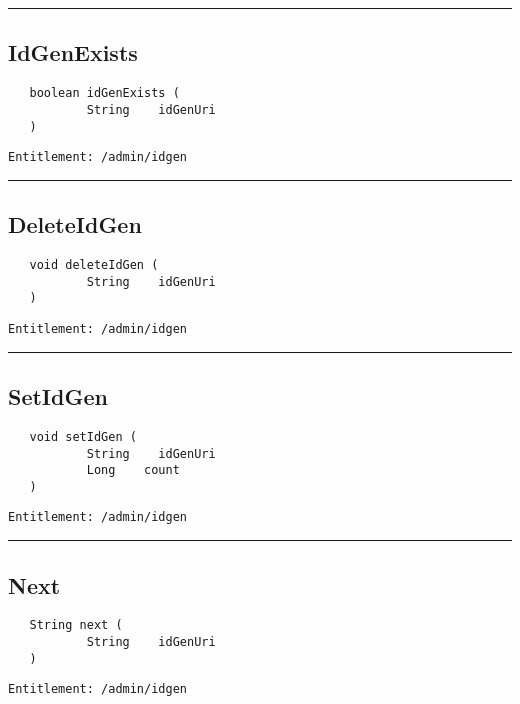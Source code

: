 \rule{12cm}{2pt}
\subsection{IdGenExists}
\label{Api:IdGenExists}
\begin{Verbatim}
   boolean idGenExists (
           String    idGenUri
   )
\end{Verbatim}
\begin{Verbatim}[formatcom=\color{Maroon}]
  Entitlement: /admin/idgen
\end{Verbatim}



\rule{12cm}{2pt}
\subsection{DeleteIdGen}
\label{Api:DeleteIdGen}
\begin{Verbatim}
   void deleteIdGen (
           String    idGenUri
   )
\end{Verbatim}
\begin{Verbatim}[formatcom=\color{Maroon}]
  Entitlement: /admin/idgen
\end{Verbatim}



\rule{12cm}{2pt}
\subsection{SetIdGen}
\label{Api:SetIdGen}
\begin{Verbatim}
   void setIdGen (
           String    idGenUri
           Long    count
   )
\end{Verbatim}
\begin{Verbatim}[formatcom=\color{Maroon}]
  Entitlement: /admin/idgen
\end{Verbatim}



\rule{12cm}{2pt}
\subsection{Next}
\label{Api:Next}
\begin{Verbatim}
   String next (
           String    idGenUri
   )
\end{Verbatim}
\begin{Verbatim}[formatcom=\color{Maroon}]
  Entitlement: /admin/idgen
\end{Verbatim}



